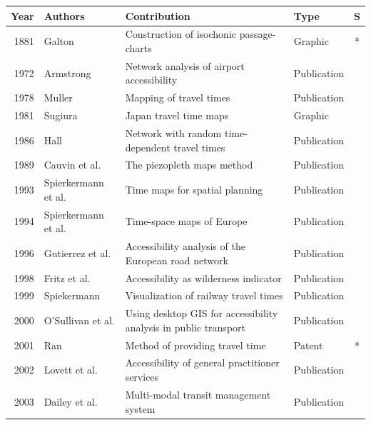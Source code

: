     \begin{table}[htb]
      \tiny \centering
      \begin{tabular}{r|l|l|l|c}
       \textbf{Year} & \textbf{Authors} & \textbf{Contribution} & \textbf{Type} & \textbf{S} \\
       \hline
        1881 & Galton \cite{galton1881construction} & Construction of isochonic passage-charts  & Graphic  & * \\
        1972 & Armstrong \cite{armstrong1972network} & Network analysis of airport accessibility  & Publication  & \\
        1978 & Muller \cite{muller1978mapping} & Mapping of travel times  & Publication  & \\
        1981 & Sugiura \cite{Sugiura1981} & Japan travel time maps  & Graphic  & \\
        1986 & Hall \cite{hall1986fastest} & Network with random time-dependent travel times  &  Publication & \\
        1989 & Cauvin et al. \cite{cauvin1989cartographic} & The piezopleth maps method  & Publication  & \\
        1993 & Spierkermann et al. \cite{spiekermann1993zeitkarten} & Time maps for spatial planning  & Publication  & \\
        1994 & Spierkermann et al. \cite{spiekermann1994new} & Time-space maps of Europe  & Publication  & \\
        1996 & Gutierrez et al. \cite{gutierrez1996accessibility} & Accessibility analysis of the European road network  & Publication  & \\
        1998 & Fritz et al. \cite{fritz1998accessibility} &  Accessibility as wilderness indicator  & Publication  & \\
        1999 & Spiekermann \cite{spiekermann1999visualisierung} & Visualization of railway travel times & Publication & \\
        2000 & O'Sullivan et al. \cite{o2000using} & Using desktop GIS for accessibility analysis in public transport  & Publication  & \\
        2001 & Ran \cite{ran2001method} &  Method of providing travel time  & Patent & * \\
        2002 & Lovett et al. \cite{lovett2002car} & Accessibility of general practitioner services  & Publication  & \\
        2003 & Dailey et al. \cite{dailey2003design} &  Multi-modal transit management system & Publication  & \\

\end{tabular}
\end{table}
